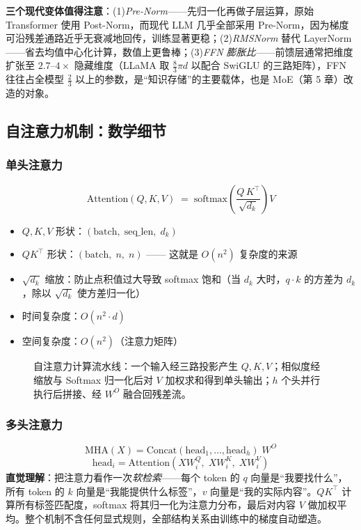 \documentclass[12pt,a4paper]{article}
\begin{document}
\textbf{三个现代变体值得注意}：(1)\emph{Pre-Norm}——先归一化再做子层运算，原始 Transformer 使用 Post-Norm，而现代 LLM 几乎全部采用 Pre-Norm，因为梯度可沿残差通路近乎无衰减地回传，训练显著更稳；(2)\emph{RMSNorm} 替代 LayerNorm——省去均值中心化计算，数值上更鲁棒；(3)\emph{FFN 膨胀比}——前馈层通常把维度扩张至 $2.7\text{--}4\times$ 隐藏维度（LLaMA 取 $\frac{8}{3}\pi d$ 以配合 SwiGLU 的三路矩阵），FFN 往往占全模型 $\frac{2}{3}$ 以上的参数，是“知识存储”的主要载体，也是 MoE（第 5 章）改造的对象。

\subsection{自注意力机制：数学细节}
\subsubsection{单头注意力}
\[
\text{Attention}(Q, K, V) \;=\; \text{softmax}\!\left(\frac{Q\, K^\top}{\sqrt{d_k}}\right) V
\]
\begin{itemize}
  \item $Q, K, V$ 形状：$(\text{batch},\; \text{seq\_len},\; d_k)$
  \item $QK^\top$ 形状：$(\text{batch},\; n,\; n)$ —— 这就是 $O(n^2)$ 复杂度的来源
  \item $\sqrt{d_k}$ 缩放：防止点积值过大导致 softmax 饱和（当 $d_k$ 大时，$q\cdot k$ 的方差为 $d_k$，除以 $\sqrt{d_k}$ 使方差归一化）
  \item 时间复杂度：$O(n^2 \cdot d)$
  \item 空间复杂度：$O(n^2)$（注意力矩阵）
\end{itemize}

\begin{figure}[htbp]
\centering

\caption{自注意力计算流水线：一个输入经三路投影产生 $Q,K,V$；相似度经缩放与 Softmax 归一化后对 $V$ 加权求和得到单头输出；$h$ 个头并行执行后拼接、经 $W^O$ 融合回残差流。}
\label{fig:attn}
\end{figure}

\subsubsection{多头注意力}
\[
\text{MHA}(X) = \text{Concat}(\text{head}_1, \ldots, \text{head}_h)\; W^O
\]
\[
\text{head}_i = \text{Attention}(X W_i^Q,\; X W_i^K,\; X W_i^V)
\]
\textbf{直觉理解}：把注意力看作一次\emph{软检索}——每个 token 的 $q$ 向量是“我要找什么”，所有 token 的 $k$ 向量是“我能提供什么标签”，$v$ 向量是“我的实际内容”。$QK^\top$ 计算所有标签匹配度，softmax 将其归一化为注意力分布，最后对内容 $V$ 做加权平均。整个机制不含任何显式规则，全部结构关系由训练中的梯度自动塑造。
\end{document}
